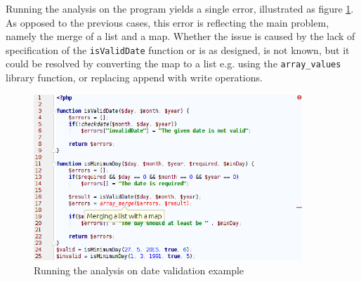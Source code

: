 Running the analysis on the program yields a single error, illustrated as figure \ref{fig:dateScreenshot}. As opposed to the previous cases, this error is reflecting the main problem, namely the merge of a list and a map. Whether the issue is caused by the lack of specification of the \texttt{isValidDate} function or is as designed, is not known, but it could be resolved by converting the map to a list e.g. using the \texttt{array\_values} library function, or replacing append with write operations.

\begin{figure}
\centering
\includegraphics[width=0.9\textwidth]{chapters/caseStudy/screens/date}
\caption{Running the analysis on date validation example}
\label{fig:dateScreenshot}
\end{figure}
